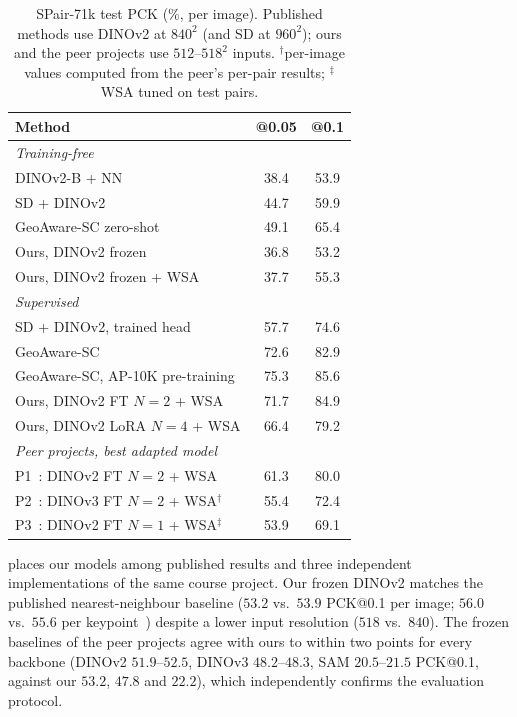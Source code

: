 \begin{table}[t]
\centering
\caption{SPair-71k test PCK (\%, per image). Published methods use DINOv2 at $840^2$ (and SD at $960^2$); ours and the peer projects use $512$--$518^2$ inputs. $^\dagger$per-image values computed from the peer's per-pair results; $^\ddagger$WSA tuned on test pairs.}
\label{tab:comparison}
\small
\setlength{\tabcolsep}{4pt}
\begin{tabular}{lcc}
\toprule
Method & @0.05 & @0.1 \\
\midrule
\multicolumn{3}{l}{\emph{Training-free}} \\
DINOv2-B + NN~\cite{zhang2023tale,zhang2024telling} & 38.4 & 53.9 \\
SD + DINOv2~\cite{zhang2023tale} & 44.7 & 59.9 \\
GeoAware-SC zero-shot~\cite{zhang2024telling} & 49.1 & 65.4 \\
Ours, DINOv2 frozen & 36.8 & 53.2 \\
Ours, DINOv2 frozen + WSA & 37.7 & 55.3 \\
\midrule
\multicolumn{3}{l}{\emph{Supervised}} \\
SD + DINOv2, trained head~\cite{zhang2023tale} & 57.7 & 74.6 \\
GeoAware-SC~\cite{zhang2024telling} & 72.6 & 82.9 \\
GeoAware-SC, AP-10K pre-training~\cite{zhang2024telling} & 75.3 & 85.6 \\
Ours, DINOv2 FT $N{=}2$ + WSA & 71.7 & 84.9 \\
Ours, DINOv2 LoRA $N{=}4$ + WSA & 66.4 & 79.2 \\
\midrule
\multicolumn{3}{l}{\emph{Peer projects, best adapted model}} \\
P1~\cite{peer_tomm}: DINOv2 FT $N{=}2$ + WSA & 61.3 & 80.0 \\
P2~\cite{peer_parsa}: DINOv3 FT $N{=}2$ + WSA$^\dagger$ & 55.4 & 72.4 \\
P3~\cite{peer_hesam}: DINOv2 FT $N{=}1$ + WSA$^\ddagger$ & 53.9 & 69.1 \\
\bottomrule
\end{tabular}
\end{table}

 places our models among published results and three independent implementations of the same course project. Our frozen DINOv2 matches the published nearest-neighbour baseline ($53.2$ vs.\ $53.9$ PCK@0.1 per image; $56.0$ vs.\ $55.6$ per keypoint~\cite{zhang2023tale}) despite a lower input resolution ($518$ vs.\ $840$). The frozen baselines of the peer projects agree with ours to within two points for every backbone (DINOv2 $51.9$--$52.5$, DINOv3 $48.2$--$48.3$, SAM $20.5$--$21.5$ PCK@0.1, against our $53.2$, $47.8$ and $22.2$), which independently confirms the evaluation protocol.

